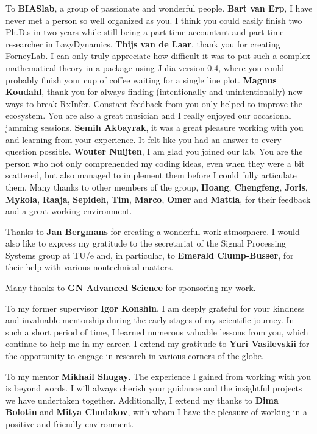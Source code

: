 To \textbf{BIASlab}, a group of passionate and wonderful people.
\textbf{Bart van Erp}, I have never met a person so well organized as you. 
I think you could easily finish two Ph.D.s in two years while still being a part-time accountant and part-time researcher in LazyDynamics. 
\textbf{Thijs van de Laar}, thank you for creating ForneyLab. I can only truly appreciate how difficult it was to put such
a complex mathematical theory in a package using Julia version 0.4, where you could probably finish your cup of coffee waiting for a single line plot.
\textbf{Magnus Koudahl}, thank you for always finding (intentionally and unintentionally) new ways to break RxInfer. 
Constant feedback from you only helped to improve the ecosystem. You are also a great musician and I really
enjoyed our occasional jamming sessions.
\textbf{Semih Akbayrak}, it was a great pleasure working with you and learning from your experience.
It felt like you had an answer to every question possible.
\textbf{Wouter Nuijten}, I am glad you joined our lab.  
You are the person who not only comprehended my coding ideas, even when they were a bit scattered, 
but also managed to implement them before I could fully articulate them.
Many thanks to other members of the group, \textbf{Hoang}, \textbf{Chengfeng}, \textbf{Joris}, \textbf{Mykola}, \textbf{Raaja}, \textbf{Sepideh}, \textbf{Tim}, \textbf{Marco}, \textbf{Omer} and \textbf{Mattia}, for their feedback and a great working environment. 

Thanks to \textbf{Jan Bergmans} for creating a wonderful work atmosphere. I would also like to express my gratitude to the secretariat of the Signal Processing Systems group at TU/e and, in particular, to \textbf{Emerald Clump-Busser}, for their help with various nontechnical matters.

Many thanks to \textbf{GN Advanced Science} for sponsoring my work.

To my former supervisor \textbf{Igor Konshin}. I am deeply grateful for your kindness and invaluable mentorship during the early stages of my scientific journey. In such a short period of time, I learned numerous valuable lessons from you, which continue to help me in my career. I extend my gratitude to \textbf{Yuri Vasilevskii} for the opportunity to engage in research in various corners of the globe.

To my mentor \textbf{Mikhail Shugay}. The experience I gained from working with you is beyond words. 
I will always cherish your guidance and the insightful projects we have undertaken together.
Additionally, I extend my thanks to \textbf{Dima Bolotin} and \textbf{Mitya Chudakov}, 
with whom I have the pleasure of working in a positive and friendly environment.

